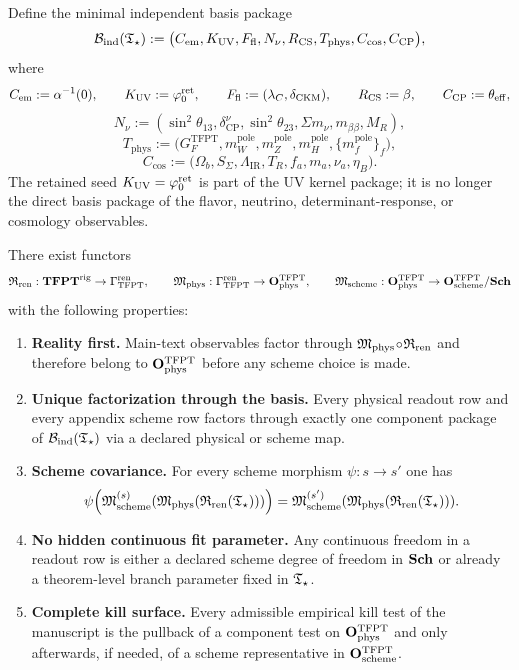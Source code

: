 \begin{definition}
\label{def:minimal-observable-basis}
Define the minimal independent basis package
\[
\mathcal B_{\mathrm{ind}}(\mathfrak T_{\star}):=
\bigl(
C_{\mathrm{em}},
K_{\mathrm{UV}},
F_{\mathrm{fl}},
N_{\nu},
R_{\mathrm{CS}},
T_{\mathrm{phys}},
C_{\mathrm{cos}},
C_{\mathrm{CP}}
\bigr),
\]
where
\[
C_{\mathrm{em}}:=\alpha^{-1}(0),
\qquad
K_{\mathrm{UV}}:=\varphi_0^{\mathrm{ret}},
\qquad
F_{\mathrm{fl}}:=(\lambda_C,\delta_{\mathrm{CKM}}),
\qquad
R_{\mathrm{CS}}:=\beta,
\qquad
C_{\mathrm{CP}}:=\theta_{\mathrm{eff}},
\]
\[
N_{\nu}:=(\sin^2\theta_{13},\delta_{\mathrm{CP}}^\nu,\sin^2\theta_{23},\Sigma m_\nu,m_{\beta\beta},M_R),
\]
\[
T_{\mathrm{phys}}
:=
\bigl(
G_F^{\mathrm{TFPT}},
m_W^{\mathrm{pole}},
m_Z^{\mathrm{pole}},
m_H^{\mathrm{pole}},
\{m_f^{\mathrm{pole}}\}_f
\bigr),
\]
\[
C_{\mathrm{cos}}
:=
\bigl(
\Omega_b,S_\Sigma,\Lambda_{\mathrm{IR}},T_R,f_a,m_a,\nu_a,\eta_B
\bigr).
\]
The retained seed $K_{\mathrm{UV}}=\varphi_0^{\mathrm{ret}}$ is part of the UV kernel package; it is no longer the
direct basis package of the flavor, neutrino, determinant-response, or cosmology observables.
\end{definition}

\begin{theorem}
\label{thm:operational-completeness}
There exist functors
\[
\mathfrak R_{\mathrm{ren}}:\mathbf{TFPT}^{\mathrm{rig}}\to\Gamma_{\mathrm{TFPT}}^{\mathrm{ren}},
\qquad
\mathfrak M_{\mathrm{phys}}:\Gamma_{\mathrm{TFPT}}^{\mathrm{ren}}\to\mathbf O_{\mathrm{phys}}^{\mathrm{TFPT}},
\qquad
\mathfrak M_{\mathrm{scheme}}:\mathbf O_{\mathrm{phys}}^{\mathrm{TFPT}}\to\mathbf O_{\mathrm{scheme}}^{\mathrm{TFPT}}/\mathbf{Sch}
\]
with the following properties:
\begin{enumerate}[label=\textbf{(O\arabic*)}, leftmargin=2em, topsep=3pt, itemsep=3pt]
    \item \textbf{Reality first.}
    Main-text observables factor through $\mathfrak M_{\mathrm{phys}}\!\circ\!\mathfrak R_{\mathrm{ren}}$ and therefore belong to
    $\mathbf O_{\mathrm{phys}}^{\mathrm{TFPT}}$ before any scheme choice is made.
    \item \textbf{Unique factorization through the basis.}
    Every physical readout row and every appendix scheme row factors through exactly one component
    package of $\mathcal B_{\mathrm{ind}}(\mathfrak T_{\star})$ via a declared physical or scheme map.
    \item \textbf{Scheme covariance.}
    For every scheme morphism $\psi:s\to s'$ one has
    \[
    \psi\!\left(\mathfrak M_{\mathrm{scheme}}^{(s)}(\mathfrak M_{\mathrm{phys}}(\mathfrak R_{\mathrm{ren}}(\mathfrak T_{\star})))\right)
    =
    \mathfrak M_{\mathrm{scheme}}^{(s')}(\mathfrak M_{\mathrm{phys}}(\mathfrak R_{\mathrm{ren}}(\mathfrak T_{\star}))).
    \]
    \item \textbf{No hidden continuous fit parameter.}
    Any continuous freedom in a readout row is either a declared scheme degree of freedom in
    $\mathbf{Sch}$ or already a theorem-level branch parameter fixed in $\mathfrak T_{\star}$.
    \item \textbf{Complete kill surface.}
    Every admissible empirical kill test of the manuscript is the pullback of a component test on
    $\mathbf O_{\mathrm{phys}}^{\mathrm{TFPT}}$ and only afterwards, if needed, of a scheme representative in $\mathbf O_{\mathrm{scheme}}^{\mathrm{TFPT}}$.
\end{enumerate}
\end{theorem}

